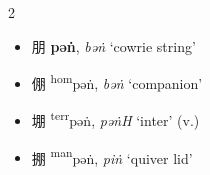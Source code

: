 \begin{multicols}{2}

\medskip

\begin{itemize}
    \item {\Large{朋}} %
    {\large{\textbf{pəṅ}}},
    \textit{bəṅ} `cowrie string' %

    \item {\Large{倗}} %
    {\large{{\textsuperscript{hom}}pəṅ}},
    \textit{bəṅ} `companion' %


    \item {\Large{堋}} %
    {\large{{\textsuperscript{terr}}pəṅ}},
    \textit{pəṅH} `inter' (v.) %




    

    \item {\Large{掤}} %
    {\large{{\textsuperscript{man}}pəṅ}},
    \textit{piṅ} `quiver lid' %

  

\end{itemize}


\end{multicols}

